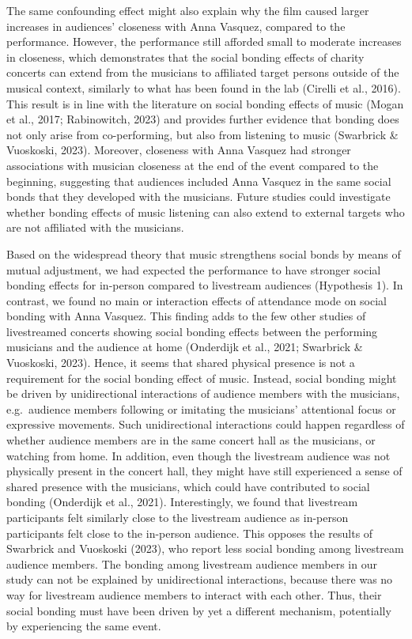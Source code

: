\documentclass[
  man,floatsintext]{apa6}
\begin{document}
The same confounding effect might also explain why the film caused larger increases in audiences' closeness with Anna Vasquez, compared to the performance. However, the performance still afforded small to moderate increases in closeness, which demonstrates that the social bonding effects of charity concerts can extend from the musicians to affiliated target persons outside of the musical context, similarly to what has been found in the lab (Cirelli et al., 2016). This result is in line with the literature on social bonding effects of music (Mogan et al., 2017; Rabinowitch, 2023) and provides further evidence that bonding does not only arise from co-performing, but also from listening to music (Swarbrick \& Vuoskoski, 2023). Moreover, closeness with Anna Vasquez had stronger associations with musician closeness at the end of the event compared to the beginning, suggesting that audiences included Anna Vasquez in the same social bonds that they developed with the musicians. Future studies could investigate whether bonding effects of music listening can also extend to external targets who are not affiliated with the musicians.

Based on the widespread theory that music strengthens social bonds by means of mutual adjustment, we had expected the performance to have stronger social bonding effects for in-person compared to livestream audiences (Hypothesis 1). In contrast, we found no main or interaction effects of attendance mode on social bonding with Anna Vasquez. This finding adds to the few other studies of livestreamed concerts showing social bonding effects between the performing musicians and the audience at home (Onderdijk et al., 2021; Swarbrick \& Vuoskoski, 2023). Hence, it seems that shared physical presence is not a requirement for the social bonding effect of music. Instead, social bonding might be driven by unidirectional interactions of audience members with the musicians, e.g.~audience members following or imitating the musicians' attentional focus or expressive movements. Such unidirectional interactions could happen regardless of whether audience members are in the same concert hall as the musicians, or watching from home. In addition, even though the livestream audience was not physically present in the concert hall, they might have still experienced a sense of shared presence with the musicians, which could have contributed to social bonding (Onderdijk et al., 2021). Interestingly, we found that livestream participants felt similarly close to the livestream audience as in-person participants felt close to the in-person audience. This opposes the results of Swarbrick and Vuoskoski (2023), who report less social bonding among livestream audience members. The bonding among livestream audience members in our study can not be explained by unidirectional interactions, because there was no way for livestream audience members to interact with each other. Thus, their social bonding must have been driven by yet a different mechanism, potentially by experiencing the same event.
\end{document}
